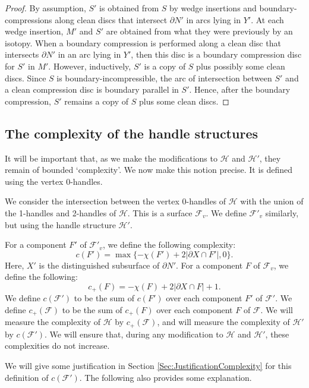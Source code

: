\documentclass[oneside]{amsart}
\numberwithin{equation}{section}
\theoremstyle{plain}
\theoremstyle{definition}
\begin{document}
\begin{proof} By assumption, $S'$ is obtained from $S$ by wedge insertions and boundary-compressions along clean discs that intersect $\partial N'$ in arcs lying in $Y'$.
At each wedge insertion, $M'$ and $S'$ are obtained from what they were previously by an isotopy. When a boundary compression
is performed along a clean disc that intersects $\partial N'$ in an arc lying in $Y'$, then this disc is a boundary compression disc for $S'$
in $M'$. However, inductively, $S'$ is a copy of $S$ plus possibly some clean discs. Since $S$ is boundary-incompressible,
the arc of intersection between $S'$ and a clean compression disc is boundary parallel in $S'$. Hence, after the
boundary compression, $S'$ remains a copy of $S$ plus some clean discs.
\end{proof}

\subsection{The complexity of the handle structures}
\label{Subsec:ComplexityHS}

It will be important that, as we make the modifications to $\mathcal{H}$ and $\mathcal{H}'$, they remain of bounded `complexity'. We now make this
notion precise. It is defined using the vertex 0-handles.

We consider the intersection between the vertex 0-handles of $\mathcal{H}$ with the union of the 1-handles and 2-handles of $\mathcal{H}$.
This is a surface $\mathcal{F}_v$. We define $\mathcal{F}'_v$ similarly, but using the handle structure $\mathcal{H}'$.

For a component $F'$ of $\mathcal{F}'_v$, we define the following complexity: 
$$c(F') = \max\{ -\chi(F') + 2 |\partial X \cap F'|, 0 \}.$$
Here, $X'$ is the distinguished subsurface of $\partial N'$.
For a component $F$ of $\mathcal{F}_v$, we define the following: 
$$c_+(F) = -\chi(F) + 2 |\partial X \cap F| + 1.$$
We define $c(\mathcal{F}')$ to be the sum of $c(F')$ over each component $F'$ of $\mathcal{F}'$.
We define $c_+(\mathcal{F})$ to be the sum of $c_+(F)$ over each component $F$ of $\mathcal{F}$.
We will measure the complexity of $\mathcal{H}$ by $c_+(\mathcal{F})$, and will measure the complexity of
$\mathcal{H}'$ by $c(\mathcal{F}')$. We will ensure that, during any modification to $\mathcal{H}$
and $\mathcal{H}'$, these complexities do not increase.

We will give some justification in Section \ref{Sec:JustificationComplexity} for this definition of $c(\mathcal{F}')$.
The following also provides some explanation.
\end{document}
